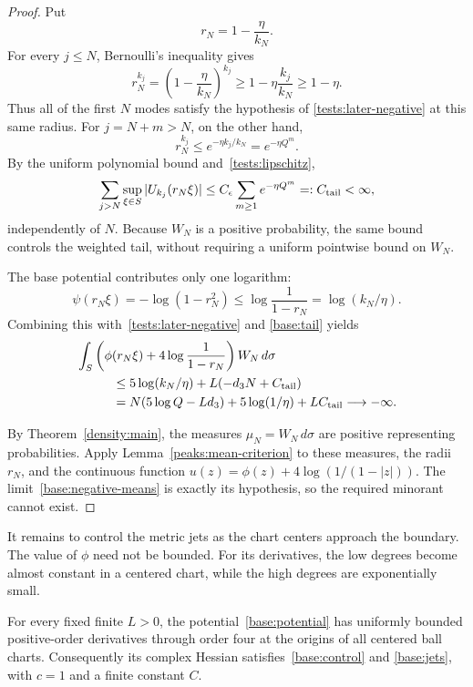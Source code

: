 \begin{proof}
Put
\begin{equation}\label{base:radii}
 r_N=1-\frac{\eta}{k_N}.
\end{equation}
For every $j\le N$, Bernoulli's inequality gives
\[
 r_N^{k_j}
 =\left(1-\frac{\eta}{k_N}\right)^{k_j}
 \ge1-\eta\frac{k_j}{k_N}\ge1-\eta.
\]
Thus all of the first $N$ modes satisfy the hypothesis of
\eqref{tests:later-negative} at this same radius.
For $j=N+m>N$, on the other hand,
\[
 r_N^{k_j}\le e^{-\eta k_j/k_N}=e^{-\eta Q^m}.
\]
By the uniform polynomial bound and~\eqref{tests:lipschitz},
\begin{equation}\label{base:tail}
 \sum_{j>N}\sup_{\xi\in S}|U_{k_j}(r_N\xi)|
 \le C_\epsilon\sum_{m\ge1}e^{-\eta Q^m}
 =:C_{\rm tail}<\infty,
\end{equation}
independently of $N$.  Because $W_N$ is a positive probability,
the same bound controls the weighted tail, without requiring a
uniform pointwise bound on $W_N$.

The base potential contributes only one logarithm:
\[
 \psi(r_N\xi)=-\log(1-r_N^2)
 \le\log\frac1{1-r_N}=\log(k_N/\eta).
\]
Combining this with~\eqref{tests:later-negative} and
\eqref{base:tail} yields
\begin{align}
 &\int_S\left(\phi(r_N\xi)
                  +4\log\frac1{1-r_N}\right)W_N\,d\sigma \notag\\
 &\hspace{1cm}\le
 5\log(k_N/\eta)+L(-d_3N+C_{\rm tail}) \notag\\
 &\hspace{1cm}=
 N(5\log Q-Ld_3)+5\log(1/\eta)+LC_{\rm tail}
 \longrightarrow-\infty.
 \label{base:negative-means}
\end{align}

By Theorem~\ref{density:main}, the measures
$\mu_N=W_N\,d\sigma$ are positive representing probabilities.
Apply Lemma~\ref{peaks:mean-criterion} to these measures, the radii
$r_N$, and the continuous function
$u(z)=\phi(z)+4\log(1/(1-|z|))$.
The limit~\eqref{base:negative-means} is exactly its hypothesis,
so the required minorant cannot exist.
\end{proof}

It remains to control the metric jets as the chart centers
approach the boundary.  The value of $\phi$ need not be bounded.
For its derivatives, the low degrees become almost constant in a
centered chart, while the high degrees are exponentially small.

\begin{lemma}\label{base:chart-estimates}
For every fixed finite $L>0$, the potential~\eqref{base:potential}
has uniformly bounded positive-order derivatives through order four
at the origins of all centered ball charts.  Consequently its
complex Hessian satisfies~\eqref{base:control} and
\eqref{base:jets}, with $c=1$ and a finite constant $C$.
\end{lemma}

